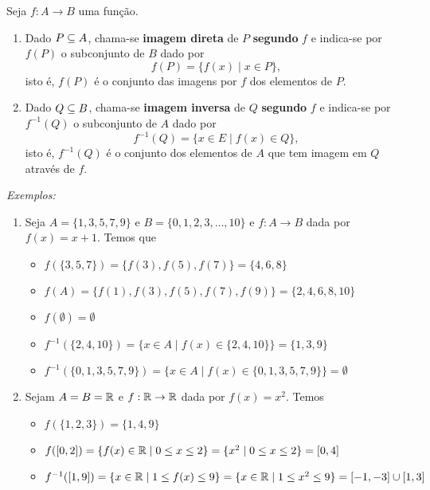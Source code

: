 \begin{definicao}
	Seja $f : A \to B$ uma fun{\c c}{\~a}o.
	\begin{enumerate}
		\item Dado $P \subseteq A$, chama-se \textbf{imagem direta} de $P$  \textbf{segundo} $f$ e indica-se por $f(P)$ o subconjunto de $B$ dado por
		\[
			f(P) = \{f(x) \mid x \in P\},
		\]
		isto {\'e}, $f(P)$ {\'e} o conjunto das imagens por $f$ dos elementos de $P$.

		\item Dado $Q \subseteq B$, chama-se \textbf{imagem inversa} de $Q$ \textbf{segundo} $f$ e indica-se por $f^{-1}(Q)$ o subconjunto de $A$ dado por
		\[
			f^{-1}(Q) = \{x \in E \mid f(x) \in Q\},
		\]
		isto {\'e}, $f^{-1}(Q)$ {\'e} o conjunto dos elementos de $A$ que tem imagem em $Q$ atrav{\'e}s de $f$.
	\end{enumerate}
\end{definicao}

{\it Exemplos:}
\begin{enumerate}
	\item Seja $A = \{1, 3, 5, 7, 9 \}$ e $B = \{0, 1, 2, 3, \dots, 10\}$ e $f : A \to B$ dada por $f(x) = x + 1$. Temos que
	\begin{itemize}
		\item $f(\{3, 5, 7\}) = \{f(3), f(5), f(7)\} = \{4, 6, 8\}$

		\item $f(A) = \{f(1), f(3), f(5), f(7), f(9)\} = \{2, 4, 6, 8, 10\}$

		\item $f(\emptyset) = \emptyset$

		\item $f^{-1}(\{2, 4, 10\}) = \{x \in A \mid f(x) \in \{2, 4, 10\}\} = \{1, 3, 9\}$

		\item $f^{-1}(\{0, 1, 3, 5, 7, 9\}) = \{x \in A \mid f(x) \in \{0, 1, 3, 5, 7, 9\}\} = \emptyset$
	\end{itemize}

	\item Sejam $A = B= \mathbb{R}$ e $f : \mathbb{R} \to \mathbb{R}$ dada por $f(x) = x^2$. Temos
	\begin{itemize}
		\item $f(\{1, 2, 3\}) = \{1, 4, 9\}$

		\item $f([0,2]) = \{f(x) \in \mathbb{R} \mid 0 \le x \le 2 \} = \{x^2 \mid 0 \le x \le 2\} = [0, 4]$

		\item $f^{-1}([1, 9]) = \{ x \in \mathbb{R} \mid 1 \le f(x) \le 9\} = \{x \in \mathbb{R} \mid 1 \le x^2 \le 9\} = [-1, -3] \cup [1, 3]$
	\end{itemize}
\end{enumerate}


